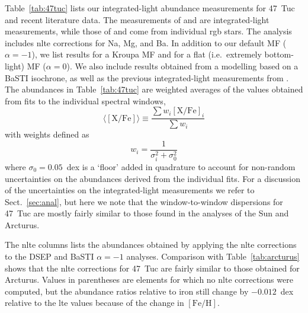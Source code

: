 \documentclass{aa}
\begin{document}
Table~\ref{tab:47tuc}  lists our integrated-light abundance measurements for 47~Tuc and recent literature data. The measurements of  and \citet[][S2013]{Sakari2013} are integrated-light measurements, while those of \citet[][KM2008]{Koch2008} and \citet[][T2014]{Thygesen2014} come from individual \ac{rgb} stars. The  analysis includes \ac{nlte} corrections for Na, Mg, and Ba.
In addition to our default MF ($\alpha=-1$), we list results for a Kroupa MF and for a flat (i.e.\ extremely bottom-light) MF ($\alpha=0$). We also include results obtained from a modelling based on a BaSTI isochrone, as well as the previous integrated-light measurements from . The abundances in Table~\ref{tab:47tuc} are weighted averages of the values obtained from fits to the individual spectral windows,
%
\begin{equation}
\langle \mathrm{[X/Fe]} \rangle \equiv \frac{\sum w_i \mathrm{[X/Fe]}_i}{\sum w_i}
\end{equation}
with weights defined as
%
\begin{equation}
w_i = \frac{1}{\sigma_i^2 + \sigma_0^2}
\label{eq:weights}
\end{equation}
%
where $\sigma_0=0.05$~dex is a `floor' added in quadrature to account for non-random uncertainties on the abundances derived from the individual fits. For a discussion of the uncertainties on the integrated-light measurements we refer to Sect.~\ref{sec:anal}, but here we note that the window-to-window dispersions for 47~Tuc are mostly fairly similar to those found in the analyses of the Sun and Arcturus. 

The \ac{nlte} columns lists the abundances obtained by applying the \ac{nlte} corrections to the DSEP and BaSTI $\alpha=-1$ analyses. Comparison with Table~\ref{tab:arcturus} shows that the \ac{nlte} corrections for 47~Tuc are fairly similar to those obtained for Arcturus. Values in parentheses are elements for which no \ac{nlte} corrections were computed, but the abundance ratios relative to iron still change by $-0.012$~dex relative to the \ac{lte} values because of the change in $\mathrm{[Fe/H]}$.
\end{document}
